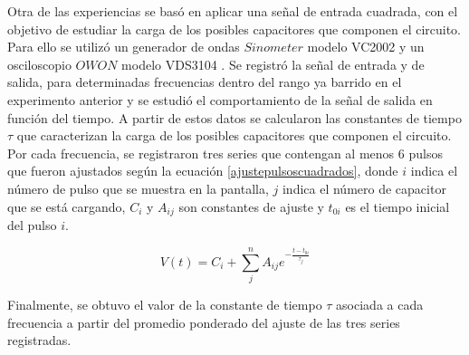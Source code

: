 Otra de las experiencias se basó en aplicar una señal de entrada cuadrada, con el objetivo de estudiar la carga de los posibles capacitores que componen el circuito. Para ello se utilizó un generador de ondas $Sinometer$ modelo VC2002 \cite{VC2002} y un osciloscopio $OWON$ modelo VDS3104 \cite{VDS3104}. Se registró la señal de entrada y de salida, para determinadas frecuencias dentro del rango ya barrido en el experimento anterior y se estudió el comportamiento de la señal de salida en función del tiempo. A partir de estos datos se calcularon las constantes de tiempo $\tau$ que caracterizan la carga de los posibles capacitores que componen el circuito. Por cada frecuencia, se registraron tres series que contengan al menos 6 pulsos que fueron ajustados según la ecuación \eqref{ajustepulsoscuadrados}, donde $i$ indica el número de pulso que se muestra en la pantalla, $j$ indica el número de capacitor que se está cargando, $C_i$ y $A_{ij}$ son constantes de ajuste y $t_{0i}$ es el tiempo inicial del pulso $i$. 

\begin{equation}
    V(t)=C_i+\sum_{j}^{n}A_{ij}e^{-{\frac{t-t_{0i}}{\tau_j}}}
    \label{ajustepulsoscuadrados}
\end{equation}

Finalmente, se obtuvo el valor de la constante de tiempo $\tau$ asociada a cada frecuencia a partir del promedio ponderado del ajuste de las tres series registradas.

